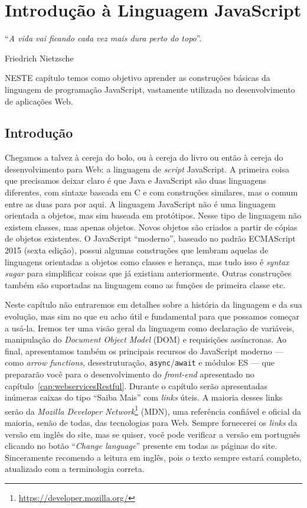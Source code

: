 \chapter{Introdução à Linguagem JavaScript}\label{cap:javaScript}
\epigraph{``\textit{A vida vai ficando cada vez mais dura perto do topo}''.}{Friedrich Nietzsche}

\lettrine[lines=4, lhang=0.1, lraise=0, loversize=0.2, findent=0.1em]{\textcolor{corTema}{N}}{ESTE} capítulo temos como objetivo aprender as construções básicas da linguagem de programação JavaScript, vastamente utilizada no desenvolvimento de aplicações Web.

\section{Introdução}

Chegamos a talvez à cereja do bolo, ou à cereja do livro ou então à cereja do desenvolvimento para Web: a linguagem de \textit{script} JavaScript. A primeira coisa que precisamos deixar claro é que Java e JavaScript são duas linguagens diferentes, com sintaxe baseada em C e com construções similares, mas o comum entre as duas para por aqui. A linguagem JavaScript não é uma linguagem orientada a objetos, mas sim baseada em protótipos. Nesse tipo de linguagem não existem classes, mas apenas objetos. Novos objetos são criados a partir de cópias de objetos existentes. O JavaScript ``moderno'', baseado no padrão ECMAScript 2015 (sexta edição), possui algumas construções que lembram aquelas de linguagens orientadas a objetos como classes e herança, mas tudo isso é \textit{syntax sugar} para simplificar coisas que já existiam anteriormente. Outras construções também são suportadas na linguagem como as funções de primeira classe etc.

Neste capítulo não entraremos em detalhes sobre a história da linguagem e da sua evolução, mas sim no que eu acho útil e fundamental para que possamos começar a usá-la. Iremos ter uma visão geral da linguagem como declaração de variáveis, manipulação do \textit{Document Object Model} (DOM) e requisições assíncronas. Ao final, apresentamos também os principais recursos do JavaScript moderno --- como \textit{arrow functions}, desestruturação, \texttt{async}/\texttt{await} e módulos ES --- que prepararão você para o desenvolvimento do \textit{front-end} apresentado no capítulo~\ref{cap:webservicesRestful}. Durante o capítulo serão apresentadas inúmeras caixas do tipo ``Saiba Mais'' com \textit{links} úteis. A maioria desses links serão da \textit{Mozilla Developer Network}\footnote{\url{https://developer.mozilla.org/}} (MDN), uma referência confiável e oficial da maioria, senão de todas, das tecnologias para Web. Sempre fornecerei os \textit{links} da versão em inglês do site, mas se quiser, você pode verificar a versão em português clicando no botão ``\textit{Change language}'' presente em todas as páginas do site. Sinceramente recomendo a leitura em inglês, pois o texto sempre estará completo, atualizado com a terminologia correta.

